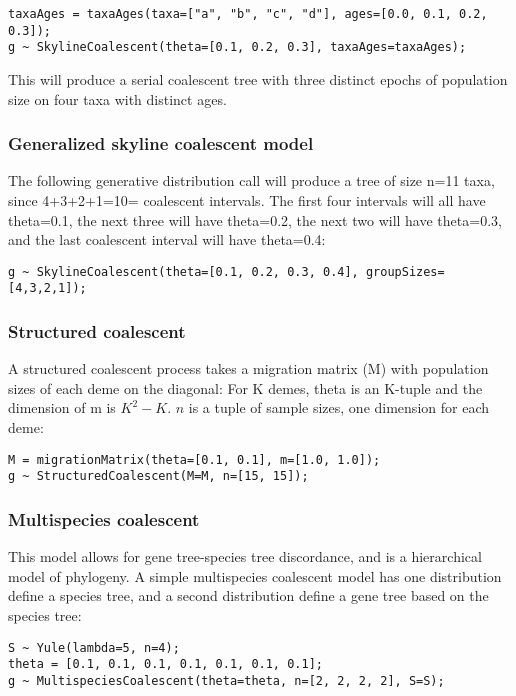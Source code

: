\documentclass[oneside]{article}
\begin{document}
\begin{verbatim}
taxaAges = taxaAges(taxa=["a", "b", "c", "d"], ages=[0.0, 0.1, 0.2, 0.3]);
g ~ SkylineCoalescent(theta=[0.1, 0.2, 0.3], taxaAges=taxaAges);
\end{verbatim}

This will produce a serial coalescent tree with three distinct epochs
of population size on four taxa with distinct ages.

\subsubsection{Generalized skyline coalescent model}

The following generative distribution call will produce a tree of size
n=11 taxa, since 4+3+2+1=10= coalescent intervals.
The first four intervals will all have theta=0.1, the next three will
have theta=0.2, the next two will have theta=0.3, and the last
coalescent interval will have theta=0.4:

\begin{verbatim}
g ~ SkylineCoalescent(theta=[0.1, 0.2, 0.3, 0.4], groupSizes=[4,3,2,1]);
\end{verbatim}

\subsubsection{Structured coalescent}

A structured coalescent process takes a migration matrix (M) with
population sizes of each deme on the diagonal:
For K demes, theta is an K-tuple and the dimension of m is $K^2 -
K$. $n$ is a tuple of sample sizes, one dimension for each deme:

\begin{verbatim}
M = migrationMatrix(theta=[0.1, 0.1], m=[1.0, 1.0]);
g ~ StructuredCoalescent(M=M, n=[15, 15]);
\end{verbatim}

\subsubsection{Multispecies coalescent}

This model allows for gene tree-species tree discordance, and is a
hierarchical model of phylogeny.
A simple multispecies coalescent model has one distribution define a
species tree, and a second distribution define a gene tree based on
the species tree:

\begin{verbatim}
S ~ Yule(lambda=5, n=4);
theta = [0.1, 0.1, 0.1, 0.1, 0.1, 0.1, 0.1];
g ~ MultispeciesCoalescent(theta=theta, n=[2, 2, 2, 2], S=S);
\end{verbatim}
\end{document}
